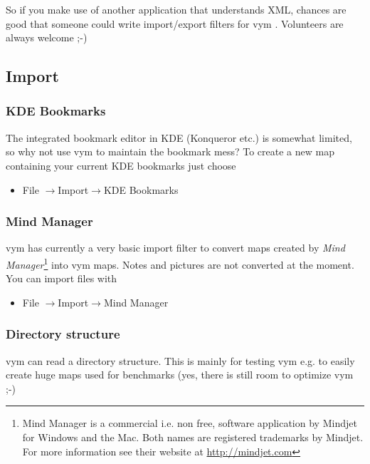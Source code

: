 \documentclass[12pt,a4paper]{article}
\newcommand{\vym}{{\sc vym }}
\newcommand{\ra}{$\longrightarrow$}
\begin{document}
So if you make use of another application that understands XML, chances
are good that someone could write import/export filters for \vym.
Volunteers are always welcome ;-)

\subsection{Import} \label{import}

\subsubsection*{KDE Bookmarks}
The integrated bookmark editor in KDE (Konqueror etc.) is somewhat
limited, so why not use \vym to maintain the bookmark mess? To create a
new map containing your current KDE bookmarks just choose
\begin{itemize}
    \item File \ra Import\ra KDE Bookmarks
\end{itemize}

\subsubsection*{Mind Manager}
\vym has currently a very basic import filter to convert maps created by
{\em Mind Manager}\footnote{Mind Manager is a commercial i.e. non free,
software application by Mindjet for Windows and the Mac. Both names are
registered trademarks by Mindjet. For more information see their website
at \href{http://mindjet.com}{http://mindjet.com}} into \vym maps. Notes
and pictures are not converted at the moment. You can import files with
\begin{itemize}
    \item File \ra Import\ra Mind Manager
\end{itemize}


\subsubsection*{Directory structure}
\vym can read a directory structure. This is mainly for
testing \vym e.g. to easily create huge maps used for benchmarks (yes,
there is still room to optimize \vym ;-)
\end{document}
